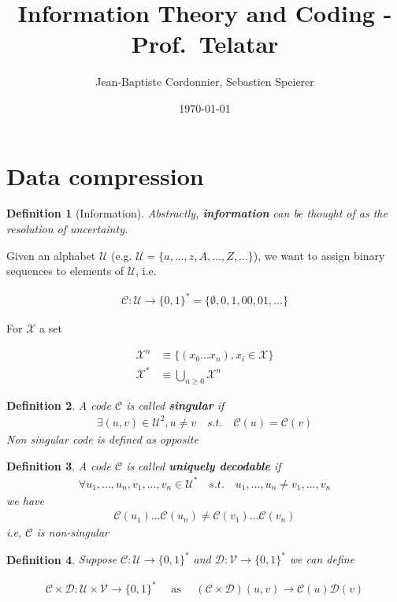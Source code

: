 \documentclass[twoside]{article}
\title{Information Theory and Coding - Prof.~Telatar}
\date{\today}
\author{Jean-Baptiste Cordonnier, Sebastien Speierer}
\newtheorem{definition}{Definition}[section]
\theoremstyle{definition} %
\def\D{\mathcal{D}}
\def\V{\mathcal{V}}
\def\U{\mathcal{U}}
\def\X{\mathcal{X}}
\def\C{\mathcal{C}}
\begin{document}
\maketitle
\setcounter{tocdepth}{1}
\tableofcontents

\cleardoublepage

\section{Data compression}

\begin{definition}[Information]
  Abstractly, \textbf{information} can be thought of as the resolution of uncertainty.
\end{definition}

Given an alphabet $\U$ (e.g. $\U = \{a, ..., z, A, ..., Z, ...\}$), we want to assign binary sequences to elements of $\U$, i.e.

\begin{align*}
	\C: \U \rightarrow \{0, 1\}^* = \{\emptyset, 0, 1, 00, 01, ...\}
\end{align*}

For $\X$ a set

\begin{align*}
	\X^n &\equiv \{ (x_0 ... x_n), x_i \in \X\} \\
	\X^* &\equiv \bigcup_{n \geq 0} \X^n
\end{align*}

\begin{definition}
	A code $\C$ is called \textbf{singular} if
	\begin{align*}
		\exists (u, v) \in \U^2, u \neq v \quad s.t. \quad \C(u) = \C(v)
	\end{align*}
	Non singular code is defined as opposite
\end{definition}

\begin{definition}
	A code $\C$ is called \textbf{uniquely decodable} if
	\begin{align*}
		\forall u_1,...,u_n,v_1,...,v_n \in \U^* \quad s.t. \quad u_1,...,u_n \neq v_1,...,v_n
	\end{align*}
	we have
	\begin{align*}
		\C(u_1)...\C(u_n) \neq \C(v_1)...\C(v_n)
	\end{align*}
	i.e, $\C$ is non-singular
\end{definition}

\begin{definition}
	Suppose $\C : \U \rightarrow \{ 0, 1\}^*$ and $\D : \V \rightarrow \{ 0, 1\}^*$ we can define

	\begin{align*}
		\C \times \D : \U \times \V \rightarrow \{0, 1\}^*
		\quad \text{ as } \quad
		(\C \times \D)(u, v) \rightarrow \C(u)\D(v)
	\end{align*}
\end{definition}
\end{document}
